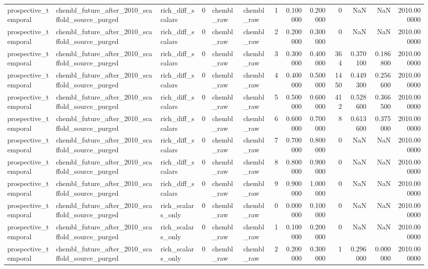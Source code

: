 \begin{longtable}{lllrllrrrrrrr}
prospective\_temporal & chembl\_future\_after\_2010\_scaffold\_source\_purged & rich\_diff\_scalars & 0 & chembl\_raw & chembl\_raw & 1 & 0.100000 & 0.200000 & 0 & NaN & NaN & 2010.000000 \\
prospective\_temporal & chembl\_future\_after\_2010\_scaffold\_source\_purged & rich\_diff\_scalars & 0 & chembl\_raw & chembl\_raw & 2 & 0.200000 & 0.300000 & 0 & NaN & NaN & 2010.000000 \\
prospective\_temporal & chembl\_future\_after\_2010\_scaffold\_source\_purged & rich\_diff\_scalars & 0 & chembl\_raw & chembl\_raw & 3 & 0.300000 & 0.400000 & 364 & 0.370100 & 0.186800 & 2010.000000 \\
prospective\_temporal & chembl\_future\_after\_2010\_scaffold\_source\_purged & rich\_diff\_scalars & 0 & chembl\_raw & chembl\_raw & 4 & 0.400000 & 0.500000 & 1450 & 0.449300 & 0.256600 & 2010.000000 \\
prospective\_temporal & chembl\_future\_after\_2010\_scaffold\_source\_purged & rich\_diff\_scalars & 0 & chembl\_raw & chembl\_raw & 5 & 0.500000 & 0.600000 & 412 & 0.528600 & 0.366500 & 2010.000000 \\
prospective\_temporal & chembl\_future\_after\_2010\_scaffold\_source\_purged & rich\_diff\_scalars & 0 & chembl\_raw & chembl\_raw & 6 & 0.600000 & 0.700000 & 8 & 0.613600 & 0.375000 & 2010.000000 \\
prospective\_temporal & chembl\_future\_after\_2010\_scaffold\_source\_purged & rich\_diff\_scalars & 0 & chembl\_raw & chembl\_raw & 7 & 0.700000 & 0.800000 & 0 & NaN & NaN & 2010.000000 \\
prospective\_temporal & chembl\_future\_after\_2010\_scaffold\_source\_purged & rich\_diff\_scalars & 0 & chembl\_raw & chembl\_raw & 8 & 0.800000 & 0.900000 & 0 & NaN & NaN & 2010.000000 \\
prospective\_temporal & chembl\_future\_after\_2010\_scaffold\_source\_purged & rich\_diff\_scalars & 0 & chembl\_raw & chembl\_raw & 9 & 0.900000 & 1.000000 & 0 & NaN & NaN & 2010.000000 \\
prospective\_temporal & chembl\_future\_after\_2010\_scaffold\_source\_purged & rich\_scalars\_only & 0 & chembl\_raw & chembl\_raw & 0 & 0.000000 & 0.100000 & 0 & NaN & NaN & 2010.000000 \\
prospective\_temporal & chembl\_future\_after\_2010\_scaffold\_source\_purged & rich\_scalars\_only & 0 & chembl\_raw & chembl\_raw & 1 & 0.100000 & 0.200000 & 0 & NaN & NaN & 2010.000000 \\
prospective\_temporal & chembl\_future\_after\_2010\_scaffold\_source\_purged & rich\_scalars\_only & 0 & chembl\_raw & chembl\_raw & 2 & 0.200000 & 0.300000 & 1 & 0.296000 & 0.000000 & 2010.000000 \\

\end{longtable}
